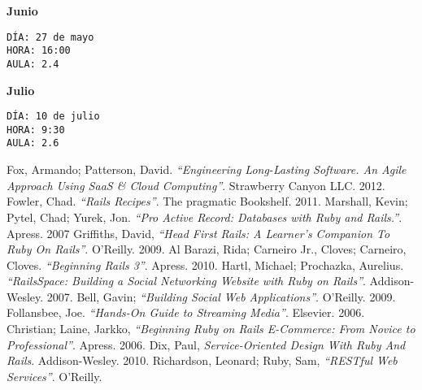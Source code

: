 \documentclass[11pt,a4paper]{article}
\begin{document}
{\bf Junio}
\begin{verbatim}
DÍA: 27 de mayo
HORA: 16:00
AULA: 2.4
\end{verbatim}

{\bf Julio}
\begin{verbatim}
DÍA: 10 de julio
HORA: 9:30
AULA: 2.6
\end{verbatim}
%

\begin{thebibliography}{99}

%

 Fox, Armando; Patterson, David. \emph{“Engineering Long-Lasting Software. An Agile Approach Using SaaS \& Cloud Computing”}. Strawberry Canyon LLC. 2012.
 Fowler, Chad. \emph{“Rails Recipes”}. The pragmatic Bookshelf. 2011.
 Marshall, Kevin; Pytel, Chad; Yurek, Jon. \emph{“Pro Active Record: Databases with Ruby and Rails.”}. Apress. 2007
 Griffiths, David, \emph{“Head First Rails: A Learner's Companion To Ruby On Rails”}. O’Reilly. 2009.
 Al Barazi, Rida; Carneiro Jr., Cloves; Carneiro, Cloves. \emph{“Beginning Rails 3”}. Apress. 2010.
 Hartl, Michael; Prochazka, Aurelius. \emph{“RailsSpace: Building a Social Networking Website with Ruby on Rails”}.  Addison-Wesley. 2007.
 Bell, Gavin; \emph{“Building Social Web Applications”}. O’Reilly. 2009.
 Follansbee, Joe. \emph{“Hands-On Guide to Streaming Media”}. Elsevier. 2006.
 Christian; Laine, Jarkko, \emph{“Beginning Ruby on Rails E-Commerce: From Novice to Professional”}. Apress. 2006.
 Dix, Paul, \emph{Service-Oriented Design With Ruby And Rails}. Addison-Wesley. 2010.
 Richardson, Leonard; Ruby, Sam, \emph{“RESTful Web Services”}. O’Reilly. 


\end{thebibliography}
\end{document}
